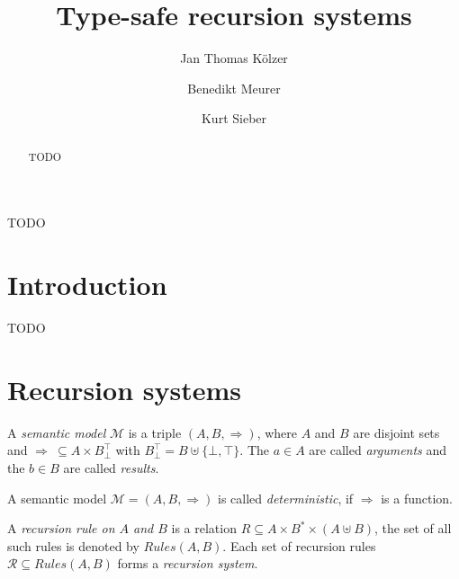 \documentclass[a4paper,draft,preprint,sort&compress]{elsarticle}
\newcommand{\M}{\ensuremath{\mathcal{M}}}
\newcommand{\R}{\ensuremath{\mathcal{R}}}
\newcommand{\Rules}{\ensuremath{\mathit{Rules}}}
\begin{document}
\begin{frontmatter}

\title{Type-safe recursion systems}

\author[fnt]{Jan Thomas K\"olzer}
\author[cus]{Benedikt Meurer}
\author[cus]{Kurt Sieber}
\address[fnt]{Naturwissenschaftlich-Technische Fakult\"at, Universit\"at Siegen, D-57068 Siegen, Germany}
\address[cus]{Compilerbau und Softwareanalyse, Universit\"at Siegen, D-57068 Siegen, Germany}

\begin{abstract}
  TODO
\end{abstract}

\begin{keyword}
  TODO
\end{keyword}

\end{frontmatter}


\section{Introduction}
\label{sec:Introduction}


TODO


\section{Recursion systems}
\label{sec:Recursion_systems}


A \emph{semantic model} $\M$ is a triple $(A,B,\Rightarrow)$, where $A$ and $B$ are disjoint sets
and \mbox{$\Rightarrow~\subseteq A \times B_\bot^\top$} with $B_\bot^\top = B \uplus \{\bot,\top\}$. The $a \in A$
are called \emph{arguments} and the $b \in B$ are called \emph{results}.

\begin{definition}
  A semantic model $\M = (A,B,\Rightarrow)$ is called \emph{deterministic}, if $\Rightarrow$ is a function.
\end{definition}

A \emph{recursion rule on $A$ and $B$} is a relation $R \subseteq A \times B^* \times (A \uplus B)$, the set
of all such rules is denoted by $\Rules(A,B)$. Each set of recursion rules \mbox{$\R \subseteq \Rules(A,B)$} forms a
\emph{recursion system}.
\end{document}
